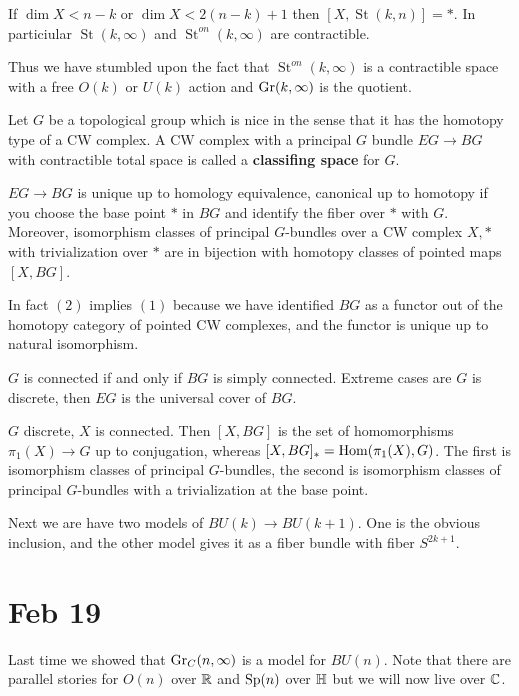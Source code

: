 \documentclass[12pt]{article}
\DeclareMathOperator{\St}{St}
\begin{document}
\begin{corollary}
    If $\dim X < n-k$ or $\dim X < 2(n-k)+1$ then $[X,\St(k,n)] = *$. In particiular $\St(k,\infty)$ and $\St^{on}(k,\infty)$ are contractible.
\end{corollary}

Thus we have stumbled upon the fact that $\St^{on}(k,\infty)$ is a contractible space with a free $O(k)$ or $U(k)$ action and $\operatorname{Gr}(k,\infty)$ is the quotient. 

\begin{definition}
    Let $G$ be a topological group which is nice in the sense that it has the homotopy type of a CW complex. A CW complex with a principal $G$ bundle $EG\to BG$ with contractible total space is called a \textbf{classifing space} for $G$.
\end{definition}

\begin{theorem}
    $EG\to BG$ is unique up to homology equivalence, canonical up to homotopy if you choose the base point $*$ in $BG$ and identify the fiber over $*$ with $G$. Moreover, isomorphism classes of principal $G$-bundles over a CW complex $X,*$ with trivialization over $*$ are in bijection with homotopy classes of pointed maps $[X, BG]$.
\end{theorem}
In fact $(2)$ implies $(1)$ because we have identified $BG$ as a functor out of the homotopy category of pointed CW complexes, and the functor is unique up to natural isomorphism.

\begin{remark}
    $G$ is connected if and only if $BG$ is simply connected. Extreme cases are $G$ is discrete, then $EG$ is the universal cover of $BG$. 
\end{remark}

\begin{remark}
    $G$ discrete, $X$ is connected. Then $[X, BG]$ is the set of homomorphisms $\pi_1(X) \to G$ up to conjugation, whereas $[X, BG]_* = \operatorname{Hom}(\pi_1(X), G)$. The first is isomorphism classes of principal $G$-bundles, the second is isomorphism classes of principal $G$-bundles with a trivialization at the base point.
\end{remark}
Next we are have two models of $BU(k) \to BU(k+1)$. One is the obvious inclusion, and the other model gives it as a fiber bundle with fiber $S^{2k+1}$. 

\section{Feb 19}
Last time we showed that $\operatorname{Gr}_C(n,\infty)$ is a model for $BU(n)$. Note that there are parallel stories for $O(n)$ over $\mathbb{R}$ and $\operatorname{Sp}(n)$ over $\mathbb{H}$ but we will now live over $\mathbb{C}$.
\end{document}

